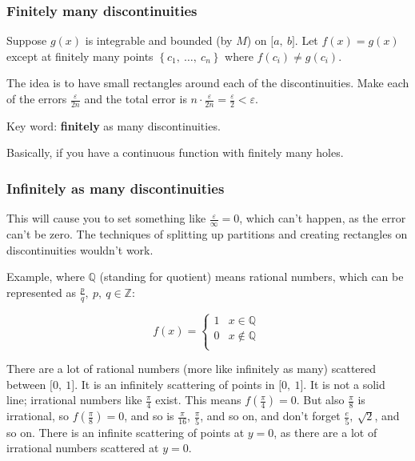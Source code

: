 \documentclass[12pt]{article}
\theoremstyle{plain}
\theoremstyle{remark}
\theoremstyle{definition}
\begin{document}
\subsubsection{Finitely many
discontinuities}

Suppose \(g(x)\) is integrable and bounded (by \(M\)) on
\(\lbrack a,\ b\rbrack\). Let \(f(x) = g(x)\) except at finitely many
points \(\left\{ c_{1},\ \ldots,\ c_{n} \right\}\) where
\(f\left( c_{i} \right) \neq g\left( c_{i} \right)\).

The idea is to have small rectangles around each of the discontinuities.
Make each of the errors \(\frac{\varepsilon}{2n}\) and the total error
is
\(n \cdot \frac{\varepsilon}{2n} = \frac{\varepsilon}{2} < \varepsilon\).

Key word: \textbf{finitely} as many discontinuities.

Basically, if you have a continuous function with finitely many holes.


\subsubsection{Infinitely as many
discontinuities}

This will cause you to set something like
\(\frac{\varepsilon}{\infty} = 0\), which can't happen, as the error
can't be zero. The techniques of splitting up partitions and creating
rectangles on discontinuities wouldn't work.

Example, where \(\mathbb{Q}\) (standing for quotient) means rational
numbers, which can be represented as
\(\frac{p}{q},\ p,\ q\mathbb{\in Z}\):

\[f(x) = \left\{ \begin{matrix}
1 & x\mathbb{\in Q} \\
0 & x\mathbb{\notin Q} \\
\end{matrix} \right.\ \]

There are a lot of rational numbers (more like infinitely as many)
scattered between \(\lbrack 0,\ 1\rbrack\). It is an infinitely
scattering of points in \(\lbrack 0,\ 1\rbrack\). It is not a solid
line; irrational numbers like \(\frac{\pi}{4}\) exist. This means
\(f\left( \frac{\pi}{4} \right) = 0\). But also \(\frac{\pi}{8}\) is
irrational, so \(f\left( \frac{\pi}{8} \right) = 0\), and so is
\(\frac{\pi}{16}\), \(\frac{\pi}{5}\), and so on, and don't forget
\(\frac{e}{5},\ \sqrt{2}\), and so on. There is an infinite scattering
of points at \(y = 0\), as there are a lot of irrational numbers
scattered at \(y = 0\).
\end{document}

